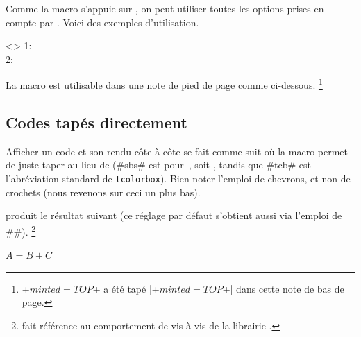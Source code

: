 \begin{tdocexa}
    Comme la macro  s'appuie sur , on peut utiliser toutes les options prises en compte par .
    Voici des exemples d'utilisation.

    \begin{tdoclatex}<>
1:  \\
2: 
	\end{tdoclatex}
\end{tdocexa}


\begin{tdocnote}
    La macro  est utilisable dans une note de pied de page comme ci-dessous.%
    \footnote{
        \tdoclatexin+$minted = TOP$+ a été tapé \tdoclatexin|\tdoclatexin+$minted = TOP$+| dans cette note de bas de page.
    }
\end{tdocnote}



\subsection{Codes tapés directement}
\label{tutodoc-listing-latex-direct}

\begin{tdocexa}
    Afficher un code et son rendu côte à côte se fait comme suit où la macro  permet de juste taper  au lieu de  (\tdoclatexin#sbs# est pour \,, soit , tandis que \tdoclatexin#tcb# est l'abréviation standard de \texttt{tcolorbox}). Bien noter l'emploi de chevrons, et non de crochets (nous revenons sur ceci un plus bas).

\end{tdocexa}


\begin{tdocexa}[À la suite]
     produit le résultat suivant (ce réglage par défaut s'obtient aussi via l'emploi de \tdoclatexin##).%
    \footnote{
         fait référence au comportement  de  vis à vis de la librairie .
    }

    \begin{tdoclatex}
$A = B + C$
    \end{tdoclatex}
\end{tdocexa}


